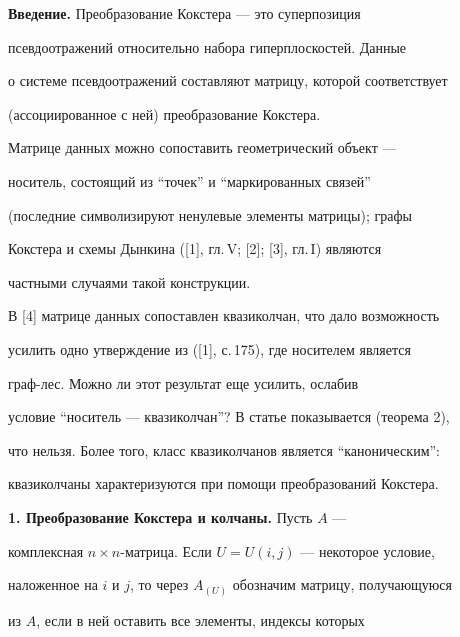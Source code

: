 \maketitle 


\label{begin} 


 


 


{\bf Введение.} Преобразование Кокстера --- это суперпозиция 


псевдоотражений относительно набора гиперплоскостей. Данные  


о системе псевдоотражений составляют матрицу, которой соответствует 


(ассоциированное с ней) преобразование Кокстера. 


Матрице данных можно сопоставить геометрический объект --- 


носитель, состоящий из ``точек'' и ``маркированных связей'' 


(последние символизируют ненулевые элементы матрицы); графы 


Кокстера и схемы Дынкина ([1], гл.\,V; [2]; [3], гл.\,I) являются 


частными случаями такой конструкции. 


 


В [4] матрице данных сопоставлен квазиколчан, что дало возможность  


усилить одно утверждение из ([1], с.\,175), где носителем является 


граф-лес. Можно ли этот результат еще усилить, ослабив 


условие ``носитель --- квазиколчан''? В статье показывается (теорема 2), 


что нельзя. Более того, класс квазиколчанов является ``каноническим'': 


квазиколчаны характеризуются при помощи преобразований Кокстера. 


\medskip 


 


{\bf 1. Преобразование Кокстера и колчаны.} Пусть $A$ --- 


комплексная $n\times n$-матрица. Если $U=U(i,j)$ --- некоторое условие, 


наложенное на $i$ и $j$, то через $A_{(U)}$ обозначим матрицу, получающуюся  


из $A$, если в ней оставить все элементы, индексы которых 


